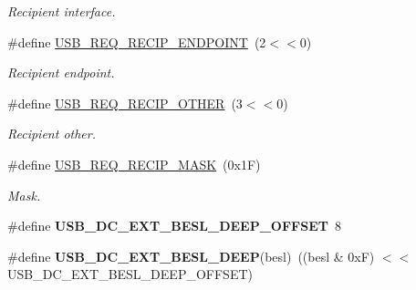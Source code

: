 \begin{DoxyCompactItemize}
\begin{DoxyCompactList}\small\item\em Recipient interface. \end{DoxyCompactList}\item 
\hypertarget{group__usb__protocol__group_ga1be00350ff83d022d41b4eae81f1e2b2}{\#define \hyperlink{group__usb__protocol__group_ga1be00350ff83d022d41b4eae81f1e2b2}{U\-S\-B\-\_\-\-R\-E\-Q\-\_\-\-R\-E\-C\-I\-P\-\_\-\-E\-N\-D\-P\-O\-I\-N\-T}~(2$<$$<$0)}\label{group__usb__protocol__group_ga1be00350ff83d022d41b4eae81f1e2b2}

\begin{DoxyCompactList}\small\item\em Recipient endpoint. \end{DoxyCompactList}\item 
\hypertarget{group__usb__protocol__group_gabb5706061604f770d2ce1f3891ab0296}{\#define \hyperlink{group__usb__protocol__group_gabb5706061604f770d2ce1f3891ab0296}{U\-S\-B\-\_\-\-R\-E\-Q\-\_\-\-R\-E\-C\-I\-P\-\_\-\-O\-T\-H\-E\-R}~(3$<$$<$0)}\label{group__usb__protocol__group_gabb5706061604f770d2ce1f3891ab0296}

\begin{DoxyCompactList}\small\item\em Recipient other. \end{DoxyCompactList}\item 
\hypertarget{group__usb__protocol__group_gab1738c19d49fe1d4c7edccff90e9e9e4}{\#define \hyperlink{group__usb__protocol__group_gab1738c19d49fe1d4c7edccff90e9e9e4}{U\-S\-B\-\_\-\-R\-E\-Q\-\_\-\-R\-E\-C\-I\-P\-\_\-\-M\-A\-S\-K}~(0x1\-F)}\label{group__usb__protocol__group_gab1738c19d49fe1d4c7edccff90e9e9e4}

\begin{DoxyCompactList}\small\item\em Mask. \end{DoxyCompactList}\item 
\hypertarget{group__usb__protocol__group_gaab8a396b3d12b33ff065a0816be389e6}{\#define {\bfseries U\-S\-B\-\_\-\-D\-C\-\_\-\-E\-X\-T\-\_\-\-B\-E\-S\-L\-\_\-\-D\-E\-E\-P\-\_\-\-O\-F\-F\-S\-E\-T}~8}\label{group__usb__protocol__group_gaab8a396b3d12b33ff065a0816be389e6}

\item 
\hypertarget{group__usb__protocol__group_gaf58250e793c1e68f4f68d0850dee03fa}{\#define {\bfseries U\-S\-B\-\_\-\-D\-C\-\_\-\-E\-X\-T\-\_\-\-B\-E\-S\-L\-\_\-\-D\-E\-E\-P}(besl)~((besl \& 0x\-F) $<$$<$ U\-S\-B\-\_\-\-D\-C\-\_\-\-E\-X\-T\-\_\-\-B\-E\-S\-L\-\_\-\-D\-E\-E\-P\-\_\-\-O\-F\-F\-S\-E\-T)}\label{group__usb__protocol__group_gaf58250e793c1e68f4f68d0850dee03fa}


\end{DoxyCompactItemize}
